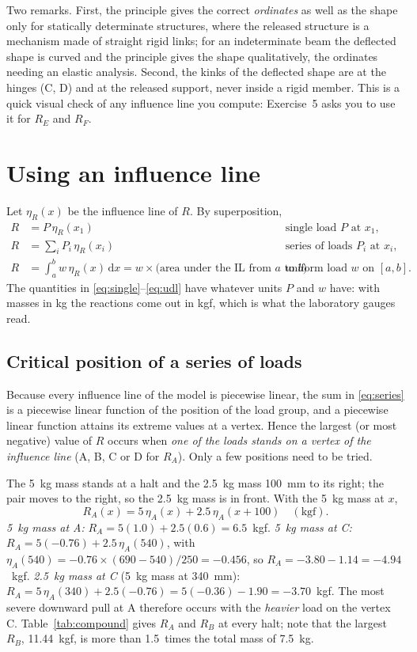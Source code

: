 \documentclass[11pt,a4paper]{article}
\newcommand{\il}[1]{\eta_{#1}}
\begin{document}
Two remarks. First, the principle gives the correct \emph{ordinates} as well as the shape only for statically determinate structures, where the released structure is a mechanism made of straight rigid links; for an indeterminate beam the deflected shape is curved and the principle gives the shape qualitatively, the ordinates needing an elastic analysis. Second, the kinks of the deflected shape are at the hinges (C, D) and at the released support, never inside a rigid member. This is a quick visual check of any influence line you compute: Exercise~5 asks you to use it for $R_E$ and $R_F$.

\section{Using an influence line}
\label{sec:use}
Let $\il{R}(x)$ be the influence line of $R$. By superposition,
\begin{align}
  R &= P\,\il{R}(x_1) && \text{single load $P$ at $x_1$,} \label{eq:single}\\
  R &= \sum_i P_i\,\il{R}(x_i) && \text{series of loads $P_i$ at $x_i$,} \label{eq:series}\\
  R &= \int_a^b w\,\il{R}(x)\,\mathrm{d}x = w \times \text{(area under the IL from $a$ to $b$)} && \text{uniform load $w$ on $[a,b]$.} \label{eq:udl}
\end{align}
The quantities in \eqref{eq:single}--\eqref{eq:udl} have whatever units $P$ and $w$ have: with masses in kg the reactions come out in kgf, which is what the laboratory gauges read.

\subsection{Critical position of a series of loads}
Because every influence line of the model is piecewise linear, the sum in \eqref{eq:series} is a piecewise linear function of the position of the load group, and a piecewise linear function attains its extreme values at a vertex. Hence the largest (or most negative) value of $R$ occurs when \emph{one of the loads stands on a vertex of the influence line} (A, B, C or D for $R_A$). Only a few positions need to be tried.

\begin{stepbox}
The \SI{5}{kg} mass stands at a halt and the \SI{2.5}{kg} mass \SI{100}{mm} to its right; the pair moves to the right, so the \SI{2.5}{kg} mass is in front. With the \SI{5}{kg} mass at $x$,
\[
  R_A(x) = 5\,\il{A}(x) + 2.5\,\il{A}(x + 100) \quad (\text{kgf}).
\]
\emph{5~kg mass at A:} $R_A = 5(1.0) + 2.5(0.6) = 6.5$~kgf. \emph{5~kg mass at C:} $R_A = 5(-0.76) + 2.5\,\il{A}(540)$, with $\il{A}(540) = -0.76 \times (690 - 540)/250 = -0.456$, so $R_A = -3.80 - 1.14 = -4.94$~kgf. \emph{2.5~kg mass at C} (5~kg mass at 340~mm): $R_A = 5\,\il{A}(340) + 2.5(-0.76) = 5(-0.36) - 1.90 = -3.70$~kgf. The most severe downward pull at A therefore occurs with the \emph{heavier} load on the vertex C. Table~\ref{tab:compound} gives $R_A$ and $R_B$ at every halt; note that the largest $R_B$, 11.44~kgf, is more than 1.5~times the total mass of 7.5~kg.
\end{stepbox}
\end{document}
